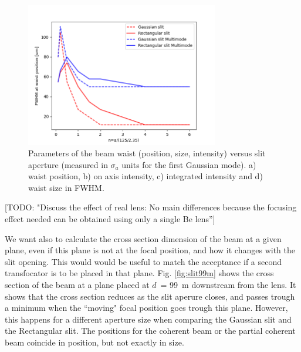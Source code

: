 \documentclass{iucr}              %
\newcommand{\todo}[1]{{\color{red}[TODO: "#1'']}}
\begin{document}
\begin{figure}
    \includegraphics[width=0.75\textwidth]{figures/FigureW4.png}
    \caption{Parameters of the beam waist (position, size, intensity) versus slit aperture (measured in $\sigma_a$ units for the first Gaussian mode).  a) waist position, b) on axis intensity, c) integrated intensity and d) waist size in FWHM.}
    \label{fig:waist}
\end{figure}


\todo{Discuss the effect of real lens: No main differences because the focusing effect needed can be obtained using only a single Be lens}

We want also to calculate the cross section dimension of the beam at a given plane, even if this plane is not at the focal position, and how it changes with the slit opening. This would would be useful to match the acceptance if a second transfocator is to be placed in that plane. Fig. \ref{fig:slit99m} shows the cross section of the beam at a plane placed at $d$~= \SI{99}{\meter} downstream from the lens. It shows that the cross section reduces as the slit aperure closes, and passes trough a minimum when the ``moving" focal position goes trough this plane. However, this happens for a different aperture size when comparing the Gaussian slit and the Rectangular slit. The positions for the coherent beam or the partial coherent beam coincide in position, but not exactly in size.
\end{document}
